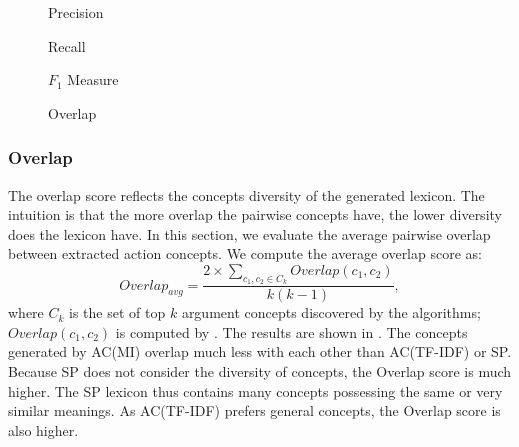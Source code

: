 \begin{figure*}[th]
\begin{minipage}[t]{0.5\columnwidth}
\centering
{}
\caption{Precision}
\label{fig:precision_ngram}
\end{minipage}
\begin{minipage}[t]{0.5\columnwidth}
\centering
{}
\caption{Recall}
\label{fig:recall_ngram}
\end{minipage}
\begin{minipage}[t]{0.5\columnwidth}
\centering
{}
\caption{$F_1$ Measure}
\label{fig:f1_ngram}
\end{minipage}
\begin{minipage}[t]{0.5\columnwidth}
\centering
{}
\caption{Overlap}
\label{fig:overlap_ngram}
\end{minipage}
\end{figure*}

\subsubsection{Overlap}
The overlap score reflects the concepts diversity of the generated lexicon.
The intuition is that the more overlap the pairwise concepts have,
the lower diversity does the lexicon have.
In this section, we evaluate the average pairwise overlap between
extracted action concepts.
We compute the average overlap score as:
\[
Overlap_{avg} = \frac{2\times \sum_{c_1,c_2\in C_k}{Overlap(c_1,c_2)}}{k(k-1)},
\]
where $C_k$ is the set of top $k$ argument concepts discovered by
the algorithms; $Overlap(c_1,c_2)$ is computed by .
The results are shown in .
The concepts generated by AC(MI) overlap much less with each other than
AC(TF-IDF) or SP. Because SP does not consider the diversity of concepts,
the Overlap score is much higher. The SP lexicon thus contains many concepts
possessing the same or very similar meanings.
As AC(TF-IDF) prefers general concepts, the Overlap score is also
higher.


